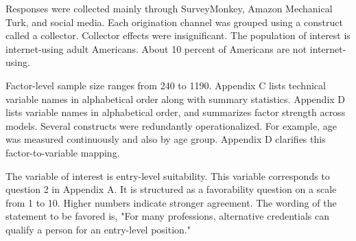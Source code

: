 \documentclass[review]{elsarticle}
\begin{document}
        Responses were collected mainly through SurveyMonkey, Amazon Mechanical
        Turk, and social media. Each origination channel was grouped using a construct called a collector.
        Collector effects were insignificant.
        The population of interest is internet-using adult Americans.
        About 10 percent of Americans are not internet-using\cite{anderson2019}.

        Factor-level sample size ranges from 240 to 1190. Appendix C lists
        technical variable names in alphabetical order along with summary
        statistics. Appendix D lists variable names in alphabetical order, and
        summarizes factor strength across models.
        Several constructs were redundantly
        operationalized. For example, age was measured
        continuously and also by age group. Appendix D clarifies this
        factor-to-variable mapping.
        
        The variable of interest is entry-level suitability.
        This variable corresponds to question 2 in Appendix A.
        It is structured as a favorability question on a scale from 1 to 10. Higher numbers indicate
        stronger agreement.
        The wording of the statement to be favored is,
        "For many professions, alternative credentials can qualify a person for an entry-level position."
        
\end{document}
